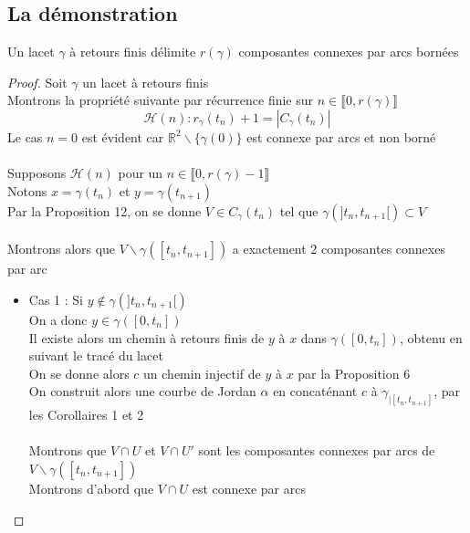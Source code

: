 \documentclass{article}
\begin{document}
\begin{flushleft}
\subsection{La démonstration}

\begin{tcolorbox}[colback=purple!20!white, colframe=purple!60!white, title = Théorème des retours]
    Un lacet $\gamma$ à retours finis délimite $r(\gamma)$ composantes connexes par arcs bornées
\end{tcolorbox}

\begin{proof}
    Soit $\gamma$ un lacet à retours finis\\
    Montrons la propriété suivante par récurrence finie sur $n \in \llbracket 0, r(\gamma) \rrbracket$
    \[ \mathcal{H}(n) : r_{\gamma}(t_n) + 1 = |C_{\gamma}(t_n)| \]
    Le cas $n = 0$ est évident car $\mathbb{R}^2 \backslash \{ \gamma(0) \}$ est connexe par arcs et non borné
    \\~\\
    Supposons $\mathcal{H}(n)$ pour un $n \in \llbracket 0, r(\gamma)-1 \rrbracket$\\
    Notons $x = \gamma(t_n)$ et $y = \gamma(t_{n+1})$\\
    Par la Proposition 12, on se donne $V \in C_{\gamma}(t_n)$ tel que $\gamma(]t_n, t_{n+1}[) \subset V$
    \\~\\
    Montrons alors que $V \backslash \gamma([t_n, t_{n+1}])$ a exactement 2 composantes connexes par arc
    \begin{itemize}
        \item Cas 1 : Si $y \notin \gamma(]t_n, t_{n+1}[)$\\
        On a donc $y \in \gamma([0, t_n])$\\
        Il existe alors un chemin à retours finis de $y$ à $x$ dans $\gamma([0, t_n])$, obtenu en suivant le tracé du lacet\\
        On se donne alors $c$ un chemin injectif de $y$ à $x$ par la Proposition 6\\
        On construit alors une courbe de Jordan $\alpha$ en concaténant $c$ à $\gamma_{\mid [t_n, t_{n+1}]}$, par les Corollaires 1 et 2
        \\~\\
        Montrons que $V \cap U$ et $V \cap U'$ sont les composantes connexes par arcs de $V \backslash \gamma([t_n, t_{n+1}])$\\
        Montrons d'abord que $V \cap U$ est connexe par arcs

\end{itemize}
\end{proof}
\end{flushleft}
\end{document}
